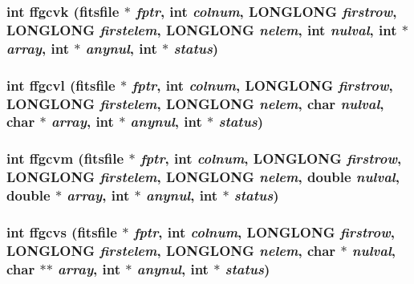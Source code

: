 \subsubsection{\setlength{\rightskip}{0pt plus 5cm}int ffgcvk (\bf{fitsfile} $\ast$ {\em fptr}, int {\em colnum}, \bf{LONGLONG} {\em firstrow}, \bf{LONGLONG} {\em firstelem}, \bf{LONGLONG} {\em nelem}, int {\em nulval}, int $\ast$ {\em array}, int $\ast$ {\em anynul}, int $\ast$ {\em status})}\label{fitsio__64_8h_5cc43e7f2f0c613cf04b0330ba75ba40}


\subsubsection{\setlength{\rightskip}{0pt plus 5cm}int ffgcvl (\bf{fitsfile} $\ast$ {\em fptr}, int {\em colnum}, \bf{LONGLONG} {\em firstrow}, \bf{LONGLONG} {\em firstelem}, \bf{LONGLONG} {\em nelem}, char {\em nulval}, char $\ast$ {\em array}, int $\ast$ {\em anynul}, int $\ast$ {\em status})}\label{fitsio__64_8h_67b03244f744a6fe2848383342dd64ba}


\subsubsection{\setlength{\rightskip}{0pt plus 5cm}int ffgcvm (\bf{fitsfile} $\ast$ {\em fptr}, int {\em colnum}, \bf{LONGLONG} {\em firstrow}, \bf{LONGLONG} {\em firstelem}, \bf{LONGLONG} {\em nelem}, double {\em nulval}, double $\ast$ {\em array}, int $\ast$ {\em anynul}, int $\ast$ {\em status})}\label{fitsio__64_8h_e3bcf54a2fef936ae5506ffc0f88b2d0}


\subsubsection{\setlength{\rightskip}{0pt plus 5cm}int ffgcvs (\bf{fitsfile} $\ast$ {\em fptr}, int {\em colnum}, \bf{LONGLONG} {\em firstrow}, \bf{LONGLONG} {\em firstelem}, \bf{LONGLONG} {\em nelem}, char $\ast$ {\em nulval}, char $\ast$$\ast$ {\em array}, int $\ast$ {\em anynul}, int $\ast$ {\em status})}\label{fitsio__64_8h_415d6eb0370f3565b6d94f3ddd5be1d7}


